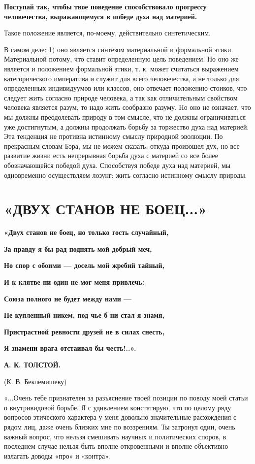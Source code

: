 {\large \textbf{Поступай так, чтобы твое поведение способствовало
прогрессу человечества, выражающемуся в победе духа над материей.}}

Такое положение является, по-моему, действительно синтетическим.

В самом деле: 1) оно является синтезом материальной и формальной
этики. Материальной потому, что ставит определенную цель поведением.
Но оно же является и положением формальной этики, т. к. может
считаться выражением категорического императива и служит для всего
человечества, а не только для определенных индивидуумов или классов,
оно отвечает положению стоиков, что следует жить согласно природе
человека, а так как отличительным свойством человека является разум,
то надо жить сообразно разуму. Но оно не означает, что мы должны
преодолевать природу в том смысле, что не должны ограничиваться уже
достигнутым, а должны продолжать борьбу за торжество духа над
материей. Эта тенденция не противна истинному смыслу природной
эволюции. По прекрасным словам Бэра, мы не можем сказать, откуда
произошел дух, но все развитие жизни есть непрерывная борьба духа с
материей со все более обозначающейся победой духа. Способствуя победе
духа над материей, мы одновременно осуществляем лозунг: жить согласно
истинному смыслу природы.

\section{«ДВУХ СТАНОВ НЕ БОЕЦ...»}

\textbf{«Двух станов не боец, но только гость случайный,}

\textbf{За правду я бы рад поднять мой добрый меч,}

\textbf{Но спор с обоими --- досель мой жребий тайный,}

\textbf{И к клятве ни один не мог меня привлечь:}

\textbf{Союза полного не будет между нами ---}

\textbf{Не купленный никем, под чье б ни стал я знамя,}

\textbf{Пристрастной ревности друзей не в силах снесть,}

\textbf{Я знамени врага отстаивал бы честь!..».}

\textbf{А. К. ТОЛСТОЙ.}

(К. В. Беклемишеву)

«...Очень тебе признателен за разъяснение твоей позиции по поводу моей
статьи о внутривидовой борьбе. Я с удивлением констатирую, что по
целому ряду вопросов этического характера у меня довольно значительные
расхождения с рядом лиц, даже очень близких мне по воззрениям. Ты
затронул один, очень важный вопрос, что нельзя смешивать научных и
политических споров, в последнем случае нельзя быть вполне
откровенными и вполне объективно излагать доводы «про» и «контра».

